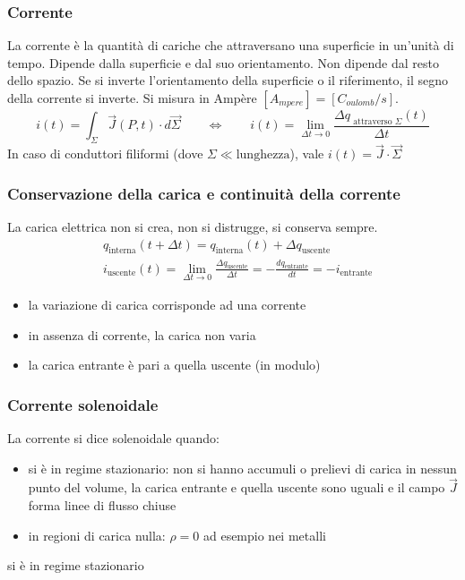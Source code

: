 \documentclass[a4paper]{article}
\begin{document}
\subsubsection*{Corrente}
La corrente è la quantità di cariche che attraversano una superficie in un'unità di tempo. Dipende dalla superficie e dal suo
orientamento. Non dipende dal resto dello spazio. Se si inverte l'orientamento della superficie o il riferimento, il segno della
corrente si inverte. Si misura in Ampère \([A_{mpere}] = [C_{oulomb}/s]\).
\[i(t) = \int_\Sigma \vec{J}(P,t) \cdot d\vec{\Sigma} \qquad \Leftrightarrow \qquad i(t) = \lim_{\Delta t \to 0} \frac{\Delta q_{\text{ attraverso }\Sigma}(t)}{\Delta t}\]
In caso di conduttori filiformi (dove \(\Sigma \ll \text{lunghezza}\)), vale \(i(t) = \vec{J} \cdot \vec{\Sigma}\)

\subsubsection*{Conservazione della carica e continuità della corrente}
La carica elettrica non si crea, non si distrugge, si conserva sempre.
\begin{align*}
	&q_\text{interna}(t + \Delta t) = q_\text{interna}(t) + \Delta q_\text{uscente} \\
	&i_\text{uscente}(t) = \lim_{\Delta t \to 0} \frac{\Delta q_\text{uscente}}{\Delta t} = -\frac{d q_\text{entrante}}{dt} = - i_\text{entrante}
\end{align*}
\begin{itemize}
	\item la variazione di carica corrisponde ad una corrente
	\item in assenza di corrente, la carica non varia
	\item la carica entrante è pari a quella uscente (in modulo)
\end{itemize}

\subsubsection*{Corrente solenoidale}
La corrente si dice solenoidale quando:
\begin{itemize}
	\item si è in regime stazionario: non si hanno accumuli o prelievi di carica in nessun punto del volume, la carica entrante
	e quella uscente sono uguali e il campo \(\vec{J}\) forma linee di flusso chiuse
	\item in regioni di carica nulla: \(\rho = 0\) ad esempio nei metalli
\end{itemize}
si è in regime stazionario
\end{document}
